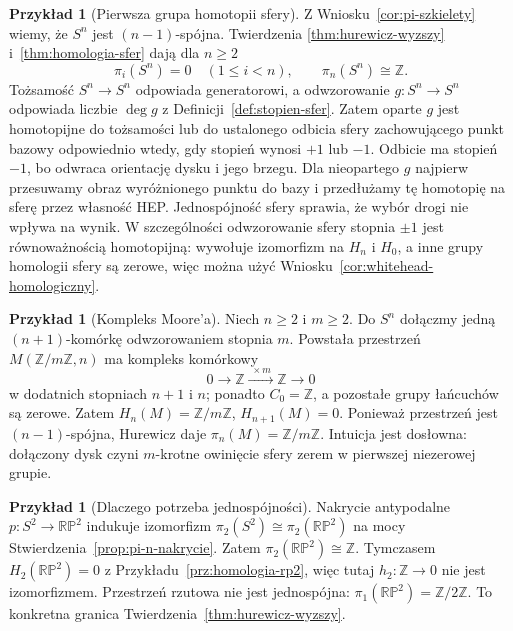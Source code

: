 \documentclass[11pt,a4paper,oneside]{report}
\newcommand{\Z}{\mathbb{Z}}
\theoremstyle{plain}
\theoremstyle{definition}
\newtheorem{przyklad}[twierdzenie]{Przykład}
\theoremstyle{remark}
\begin{document}
\begin{przyklad}[Pierwsza grupa homotopii sfery]
\label{prz:pi-sfera-hurewicz}
Z Wniosku~\ref{cor:pi-szkielety}
wiemy, że $S^n$
jest $(n-1)$-spójna.
Twierdzenia
\ref{thm:hurewicz-wyzszy}
i~\ref{thm:homologia-sfer}
dają dla $n\geq2$
\[
 \pi_i(S^n)=0\quad(1\leq i<n),
 \qquad
 \pi_n(S^n)\cong\Z.
\]
Tożsamość $S^n\to S^n$
odpowiada generatorowi,
a odwzorowanie $g:S^n\to S^n$
odpowiada liczbie
$\deg g$ z
Definicji~\ref{def:stopien-sfer}.
Zatem oparte $g$ jest homotopijne do tożsamości lub do ustalonego
odbicia sfery zachowującego punkt bazowy odpowiednio wtedy,
gdy stopień wynosi $+1$ lub $-1$.
Odbicie ma stopień $-1$, bo odwraca orientację dysku i jego brzegu.
Dla nieopartego $g$ najpierw przesuwamy obraz wyróżnionego punktu do bazy
i przedłużamy tę homotopię na sferę przez własność HEP.
Jednospójność sfery sprawia, że wybór drogi nie wpływa na wynik. W szczególności
odwzorowanie sfery stopnia
$\pm1$ jest
równoważnością
homotopijną:
wywołuje izomorfizm
na $H_n$ i $H_0$,
a inne grupy homologii
sfery są zerowe,
więc można użyć
Wniosku~\ref{cor:whitehead-homologiczny}.
\end{przyklad}

\begin{przyklad}[Kompleks Moore'a]
\label{prz:moore-hurewicz}
Niech $n\geq2$ i $m\geq2$.
Do $S^n$ dołączmy
jedną $(n+1)$-komórkę
odwzorowaniem stopnia $m$.
Powstała przestrzeń
$M(\Z/m\Z,n)$ ma
kompleks komórkowy
\[
 0\longrightarrow\Z
 \xrightarrow{\;\times m\;}\Z
 \longrightarrow0
\]
w dodatnich stopniach $n+1$ i $n$; ponadto $C_0=\Z$,
a pozostałe grupy łańcuchów są zerowe. Zatem
$H_n(M)=\Z/m\Z$,
$H_{n+1}(M)=0$.
Ponieważ przestrzeń
jest $(n-1)$-spójna,
Hurewicz daje
$\pi_n(M)=\Z/m\Z$.
Intuicja jest
dosłowna: dołączony
dysk czyni
$m$-krotne
owinięcie sfery
zerem w pierwszej
niezerowej grupie.
\end{przyklad}

\begin{przyklad}[Dlaczego potrzeba jednospójności]
\label{prz:rp2-pi2}
Nakrycie antypodalne
$p:S^2\to\mathbb{RP}^2$
indukuje izomorfizm
$\pi_2(S^2)\cong
\pi_2(\mathbb{RP}^2)$
na mocy
Stwierdzenia~\ref{prop:pi-n-nakrycie}.
Zatem
$\pi_2(\mathbb{RP}^2)\cong\Z$.
Tymczasem
$H_2(\mathbb{RP}^2)=0$
z Przykładu~\ref{prz:homologia-rp2},
więc tutaj
$h_2:\Z\to0$
nie jest izomorfizmem.
Przestrzeń rzutowa
nie jest jednospójna:
$\pi_1(\mathbb{RP}^2)=\Z/2\Z$.
To konkretna granica
Twierdzenia~\ref{thm:hurewicz-wyzszy}.
\end{przyklad}
\end{document}
